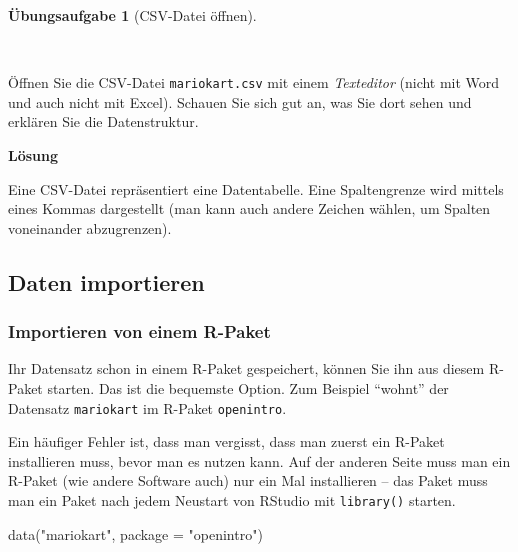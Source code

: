 \documentclass[
  letterpaper,
]{scrbook}
\newenvironment{Shaded}{\begin{snugshade}}{\end{snugshade}}
\newcommand{\AttributeTok}[1]{\textcolor[rgb]{0.40,0.45,0.13}{#1}}
\newcommand{\FunctionTok}[1]{\textcolor[rgb]{0.28,0.35,0.67}{#1}}
\newcommand{\NormalTok}[1]{\textcolor[rgb]{0.00,0.23,0.31}{#1}}
\newcommand{\StringTok}[1]{\textcolor[rgb]{0.13,0.47,0.30}{#1}}
\theoremstyle{definition}
\newtheorem{exercise}{Übungsaufgabe}[chapter]
\theoremstyle{definition}
\theoremstyle{definition}
\theoremstyle{remark}
\begin{document}
\begin{exercise}[CSV-Datei
öffnen]\protect\hypertarget{exr-csv}{}\label{exr-csv}

~

Öffnen Sie die CSV-Datei \texttt{mariokart.csv} mit einem
\emph{Texteditor} (nicht mit Word und auch nicht mit Excel). Schauen Sie
sich gut an, was Sie dort sehen und erklären Sie die Datenstruktur.

\textbf{Lösung}

Eine CSV-Datei repräsentiert eine Datentabelle. Eine Spaltengrenze wird
mittels eines Kommas dargestellt (man kann auch andere Zeichen wählen,
um Spalten voneinander abzugrenzen).

\end{exercise}

\subsection{Daten importieren}\label{daten-importieren}

\subsubsection{Importieren von einem
R-Paket}\label{importieren-von-einem-r-paket}

Ihr Datensatz schon in einem R-Paket gespeichert, können Sie ihn aus
diesem R-Paket starten. Das ist die bequemste Option. Zum Beispiel
\enquote{wohnt} der Datensatz \texttt{mariokart} im R-Paket
\texttt{openintro}.

\begin{tcolorbox}[enhanced jigsaw, colbacktitle=quarto-callout-tip-color!10!white, toptitle=1mm, colframe=quarto-callout-tip-color-frame, breakable, toprule=.15mm, bottomrule=.15mm, bottomtitle=1mm, left=2mm, opacitybacktitle=0.6, colback=white, arc=.35mm, coltitle=black, title=\textcolor{quarto-callout-tip-color}{\faLightbulb}\hspace{0.5em}{Tipp}, opacityback=0, rightrule=.15mm, leftrule=.75mm, titlerule=0mm]

Ein häufiger Fehler ist, dass man vergisst, dass man zuerst ein R-Paket
installieren muss, bevor man es nutzen kann. Auf der anderen Seite muss
man ein R-Paket (wie andere Software auch) nur ein Mal installieren --
das Paket muss man ein Paket nach jedem Neustart von RStudio mit
\texttt{library()} starten.

\end{tcolorbox}

\begin{Shaded}
\begin{Highlighting}[]
\FunctionTok{data}\NormalTok{(}\StringTok{"mariokart"}\NormalTok{, }\AttributeTok{package =} \StringTok{"openintro"}\NormalTok{)}
\end{Highlighting}
\end{Shaded}
\end{document}
